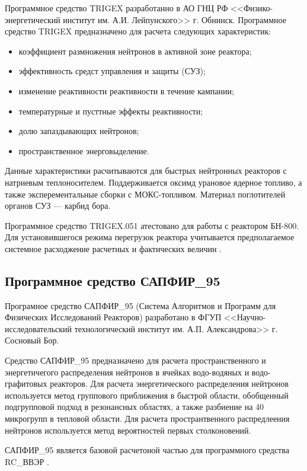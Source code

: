 Программное средство TRIGEX разработанно в АО ГНЦ РФ <<Физико-энергетический институт им. А.И. Лейпунского>> г. Обнинск.
Программное средство TRIGEX предназначено для расчета следующих характеристик:
\begin{itemize}
    \item коэффициент размножения нейтронов в активной зоне реактора;
    \item эффективность средст управления и защиты (СУЗ);
    \item изменение реактивности реактивности в течение кампании;
    \item температурные и пусттные эффекты реактивности;
    \item долю запаздывающих нейтронов;
    \item пространственное энерговыделение.
\end{itemize}

Данные характеристики расчитываются для быстрых нейтронных реакторов с натриевым теплоносителем.
Поддерживается оксимд урановое ядерное топливо, а также эксперементальные сборки с МОКС-топливом.
Материал поглотителей органов СУЗ --- карбид бора.

Программное средство TRIGEX.051 атестовано для работы с реактором БН-800.
Для установившегося режима перегрузок реактора учитывается предполагаемое системное расходжение расчетных и фактических величин \cite{trigex}.

\subsection{Программное средство САПФИР\_95}

Програмное средство САПФИР\_95 (Система Алгоритмов и Программ для Физических Исследований Реакторов) разработано в ФГУП <<Научно-исследовательский технологический институт им. А.П. Александрова>> г. Сосновый Бор.

Средство САПФИР\_95 предназначено для расчета пространственного и энергетичегого распределения нейтронов в ячейках водо-водяных и водо-графитовых реакторов.
Для расчета энергетического распределения нейтронов используется метод группового приближения в быстрой области, обобщенный подгрупповой подход в резонансных областях, а также разбиение на 40 микрогрупп в тепловой области.
Для расчета пространтвенного распредлеения нейтронов используется метод вероятностей первых столконовений.

САПФИР\_95 является базовой расчетоной частью для программного средства RC\_ВВЭР \cite{saphir-95}.

